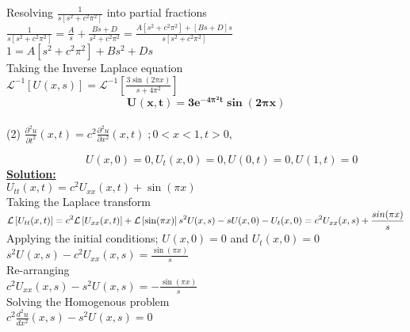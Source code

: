 \documentclass[a4paper 11pt]{article}
\newcommand{\Laplace}{\mathcal{L}}
\newcommand{\sbracket}[1]{\left[#1\right]}
\newcommand{\Un}[2]{U_{#1}(#2)}
\newcommand{\NI}{\noindent}
\newcommand{\psq}{\pi^{2}}
\newcommand{\InverseL}[1]{\Laplace^{-1}\left[#1\right]}
\newcommand{\LT}[1]{\Laplace \left[#1\right]}
\begin{document}
\NI Resolving $\displaystyle \frac{1}{s\sbracket{s^{2} + c^{2}\psq}}$ into partial fractions \\[0.2cm]
$\displaystyle
\frac{1}{s\sbracket{s^{2} + c^{2}\psq}} = \frac{A}{s} + \frac{Bs + D}{s^{2} + c^{2}\psq} = \frac{A\sbracket{s^2 + c^2 \psq} + \sbracket{Bs + D}s}{s\sbracket{s^2 + c^2 \psq}}
$\\[0.3cm]
$\displaystyle
1 = A \sbracket{s^2 + c^2 \psq} + Bs^2 + Ds
$\\[0.3cm]

\NI Taking the Inverse Laplace equation\\[0.2cm]
$\displaystyle
\InverseL{\Un{}{x,s}} = \InverseL{\frac{3\sin(2\pi x)}{s + 4\psq}}
$\\[0.3cm]

$$ \mathbf{
\Un{}{x,t} = 3e^{-4\psq t}\sin(2\pi x)}
$$
\\[0.5cm]
\NI (2) $\displaystyle \frac{\partial^2 u}{\partial t^2}(x,t) = c^2 \frac{\partial^2 u}{\partial x^2}(x,t) \; ; 0<x<1, t > 0, $

$\hspace{3cm} \displaystyle \Un{}{x,0} = 0, \Un{t}{x,0} = 0,  \Un{}{0,t} = 0,  \Un{}{1,t} = 0$\\

\NI \underline{\textbf{Solution:}} \\[0.2cm]
$\displaystyle \Un{tt}{x,t} = c^2 \Un{xx}{x,t} + \sin(\pi x) $\\[0.2cm]

\NI Taking the Laplace transform \\[0.2cm]
$\displaystyle
\LT{\Un{tt}{x,t}} = c^2 \LT{\Un{xx}{x,t}} + \LT{\sin(\pi x)} \\[0.1cm]
s^2 \Un{}{x,s} - s\Un{}{x,0} - \Un{t}{x,0} = c^2 \Un{xx}{x,s} + \frac{sin(\pi x)}{s}
$\\[0.2cm]

\NI Applying the initial conditions; $\Un{}{x,0} = 0$ and $\Un{t}{x,0} = 0 $ \\[0.2cm]
$\displaystyle
s^2\Un{}{x,s} - c^2 \Un{xx}{x,s} = \frac{\sin(\pi x)}{s}
$\\[0.2cm]

\NI Re-arranging \\[0.2cm]
$\displaystyle
c^2 \Un{xx}{x,s} - s^2 \Un{}{x,s} = - \frac{\sin(\pi x)}{s}
$\\[2cm]

\NI Solving the Homogenous problem \\[0.2cm]
$\displaystyle
c^{2} \frac{d^2 u}{dx^2}(x,s) - s^2 \Un{}{x,s} = 0
$\\[0.2cm]
\end{document}
